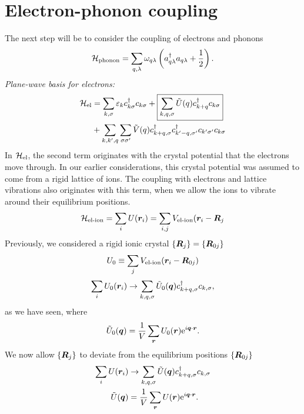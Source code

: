 \section{Electron-phonon coupling}

The next step will be to consider the coupling of electrons and phonons
\begin{equation}
	\mathcal{H}_{\text{phonon}} = \sum_{q, \lambda}\omega_{q\lambda}\left (a_{q\lambda}^{\dagger}a_{q\lambda} + \frac{1}{2}\right ).
\end{equation}
\emph{Plane-wave basis for electrons:}
\begin{align}
	\mathcal{H}_{\text{el}} &= \sum_{k,\sigma}\varepsilon_kc^{\dagger}_{k\sigma}c_{k\sigma} + \boxed{\sum_{k,q,\sigma}\tilde{U}(q)c^{\dagger}_{k+q}c_{k\sigma}} \nonumber\\
	&+\sum_{k,k',q}\sum_{\sigma\sigma'}\tilde{V}(q)c^{\dagger}_{k+q,\sigma}c^{\dagger}_{k'-q,\sigma'}c_{k'\sigma'}c_{k\sigma}
\end{align}
In $\mathcal{H}_{\text{el}}$, the second term originates with the crystal potential that the electrons move through. In our earlier considerations, this crystal potential was assumed to come from a rigid lattice of ions. The coupling with electrons and lattice vibrations also originates with this term, when we allow the ions to vibrate around their equilibrium positions.
\begin{equation}
	\mathcal{H}_{\text{el-ion}} = \sum_{i}U(\bm{r}_{i}) = \sum_{i,j}V_{\text{el-ion}}(\bm{r}_{i}-\bm{R}_{j}
\end{equation}
Previously, we considered a rigid ionic crystal $\{\bm{R}_j\} = \{\bm{R}_{0j}\}$
\begin{equation}
	U_0 \equiv \sum_{j}V_{\text{el-ion}}(\bm{r}_{i} - \bm{R}_{0j}) \\
\end{equation}
\begin{equation}
	\sum_{i}U_{0}(\bm{r}_{i}) \rightarrow \sum_{k,q,\sigma}\tilde{U}_{0}(\bm{q})c^{\dagger}_{k+q,\sigma}c_{k,\sigma},
\end{equation}
as we have seen, where
\begin{equation}
	\tilde{U}_{0}(\bm{q}) = \frac{1}{V}\sum_{\bm{r}}U_{0}(\bm{r})\mathrm{e}^{i\bm{q}\cdot\bm{r}}.
\end{equation}
We now allow $\{\bm{R}_{j}\}$ to deviate from the equilibrium positions $\{\bm{R}_{0j}\}$
\begin{align}
	\sum_{i}U(\bm{r}_{i}) &\rightarrow \sum_{k,q,\sigma}\tilde{U}(\bm{q})c^{\dagger}_{k+q, \sigma}c_{k,\sigma}\\
		\tilde{U}(\bm{q}) &= \frac{1}{V}\sum_{\bm{r}}U(\bm{r})\mathrm{e}^{i\bm{q}\cdot\bm{r}}.
\end{align}
